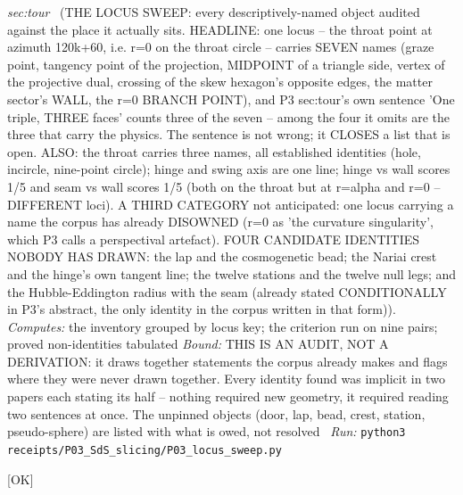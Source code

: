 \begin{description}
\textit{sec:tour} \ (THE LOCUS SWEEP: every descriptively-named object audited against the place it actually sits. HEADLINE: one locus -- the throat point at azimuth 120k+60, i.e. r=0 on the throat circle -- carries SEVEN names (graze point, tangency point of the projection, MIDPOINT of a triangle side, vertex of the projective dual, crossing of the skew hexagon's opposite edges, the matter sector's WALL, the r=0 BRANCH POINT), and P3 sec:tour's own sentence 'One triple, THREE faces' counts three of the seven -- among the four it omits are the three that carry the physics. The sentence is not wrong; it CLOSES a list that is open. ALSO: the throat carries three names, all established identities (hole, incircle, nine-point circle); hinge and swing axis are one line; hinge vs wall scores 1/5 and seam vs wall scores 1/5 (both on the throat but at r=alpha and r=0 -- DIFFERENT loci). A THIRD CATEGORY not anticipated: one locus carrying a name the corpus has already DISOWNED (r=0 as 'the curvature singularity', which P3 calls a perspectival artefact). FOUR CANDIDATE IDENTITIES NOBODY HAS DRAWN: the lap and the cosmogenetic bead; the Nariai crest and the hinge's own tangent line; the twelve stations and the twelve null legs; and the Hubble-Eddington radius with the seam (already stated CONDITIONALLY in P3's abstract, the only identity in the corpus written in that form)). 
\emph{Computes:} the inventory grouped by locus key; the criterion run on nine pairs; proved non-identities tabulated
 \emph{Bound:} THIS IS AN AUDIT, NOT A DERIVATION: it draws together statements the corpus already makes and flags where they were never drawn together. Every identity found was implicit in two papers each stating its half -- nothing required new geometry, it required reading two sentences at once. The unpinned objects (door, lap, bead, crest, station, pseudo-sphere) are listed with what is owed, not resolved
\ \emph{Run:} \texttt{python3 receipts/P03\_SdS\_slicing/P03\_locus\_sweep.py}
\item[\rcptlabel{P03_thirds_from_closure}{P3R49}\textbf{P3R49}\quad\texttt{P03\_thirds\_from\_closure}]\hfill\textsf{[OK]}\\

\end{description}
